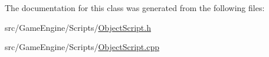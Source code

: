 The documentation for this class was generated from the following files\+:\begin{DoxyCompactItemize}
\item 
src/\+Game\+Engine/\+Scripts/\hyperlink{_object_script_8h}{Object\+Script.\+h}\item 
src/\+Game\+Engine/\+Scripts/\hyperlink{_object_script_8cpp}{Object\+Script.\+cpp}\end{DoxyCompactItemize}

